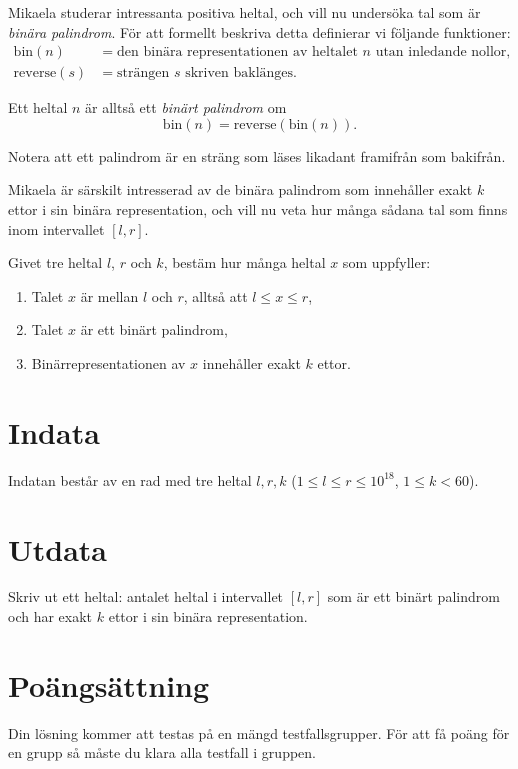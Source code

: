 \noindent

Mikaela studerar intressanta positiva heltal, och vill nu undersöka tal som är \emph{binära palindrom}.
För att formellt beskriva detta definierar vi följande funktioner:
\begin{align*}
\text{bin}(n) &= \text{den binära representationen av heltalet } n \text{ utan inledande nollor},\\
\text{reverse}(s) &= \text{strängen } s \text{ skriven baklänges}.
\end{align*}

Ett heltal $n$ är alltså ett \emph{binärt palindrom} om
\[
\text{bin}(n) = \text{reverse}(\text{bin}(n)).
\]

Notera att ett palindrom är en sträng som läses likadant framifrån som bakifrån.


Mikaela är särskilt intresserad av de binära palindrom som innehåller exakt $k$ ettor i sin binära representation,
och vill nu veta hur många sådana tal som finns inom intervallet $[l,r]$.

Givet tre heltal $l$, $r$ och $k$, bestäm hur många heltal $x$ som uppfyller:
\begin{enumerate}
    \item Talet $x$ är mellan $l$ och $r$, alltså att $l \leq x \leq r$,
    \item Talet $x$ är ett binärt palindrom,
    \item Binärrepresentationen av $x$ innehåller exakt $k$ ettor.
\end{enumerate}



\section*{Indata}
Indatan består av en rad med tre heltal $l, r, k$ ($1 \leq l \leq r \leq 10^{18}$, $1 \leq k < 60$).

\section*{Utdata}
Skriv ut ett heltal: antalet heltal i intervallet $[l, r]$ som är ett binärt palindrom och har exakt $k$ ettor i sin binära representation.


\section*{Poängsättning}
Din lösning kommer att testas på en mängd testfallsgrupper.
För att få poäng för en grupp så måste du klara alla testfall i gruppen.

